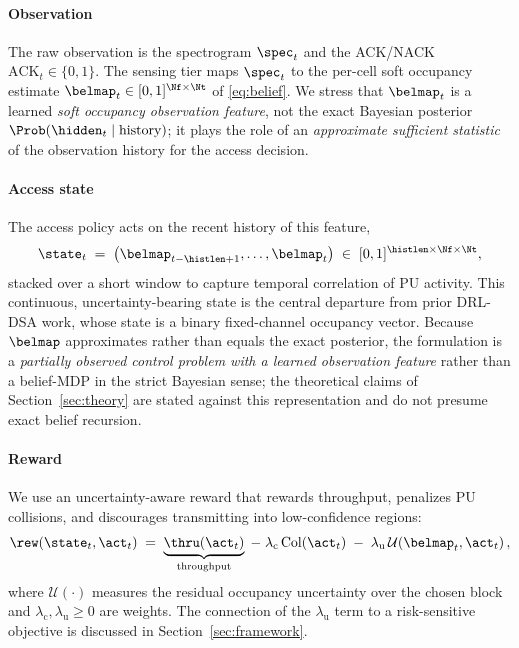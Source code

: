 \paragraph*{Observation} The raw observation is the spectrogram $\spec_t$ and
the ACK/NACK $\mathrm{ACK}_t\in\{0,1\}$. The sensing tier maps $\spec_t$ to
the per-cell soft occupancy estimate $\belmap_t\in[0,1]^{\Nf\times\Nt}$ of
\eqref{eq:belief}. We stress that $\belmap_t$ is a learned \emph{soft
occupancy observation feature}, not the exact Bayesian posterior
$\Prob(\hidden_t\mid\text{history})$; it plays the role of an
\emph{approximate sufficient statistic} of the observation history for the
access decision.

\paragraph*{Access state} The access policy acts on the recent history of
this feature,
\begin{equation}
\state_t \;=\; \bigl(\belmap_{t-\histlen+1},\dots,\belmap_{t}\bigr)
\;\in\; [0,1]^{\histlen \times \Nf \times \Nt},
\label{eq:state}
\end{equation}
stacked over a short window to capture temporal correlation of PU activity.
This continuous, uncertainty-bearing state is the central departure from
prior DRL-DSA work, whose state is a binary fixed-channel occupancy vector.
Because $\belmap$ approximates rather than equals the exact posterior, the
formulation is a \emph{partially observed control problem with a learned
observation feature} rather than a belief-MDP in the strict Bayesian sense;
the theoretical claims of Section~\ref{sec:theory} are stated against this
representation and do not presume exact belief recursion.

\paragraph*{Reward} We use an uncertainty-aware reward that rewards
throughput, penalizes PU collisions, and discourages transmitting into
low-confidence regions:
\begin{equation}
\rew(\state_t,\act_t) \;=\;
\underbrace{\thru(\act_t)}_{\text{throughput}}
\;-\; \lambda_{\mathrm{c}}\,\mathrm{Col}(\act_t)
\;-\; \lambda_{\mathrm{u}}\,\mathcal{U}\!\left(\belmap_t,\act_t\right),
\label{eq:reward}
\end{equation}
where $\mathcal{U}(\cdot)$ measures the residual occupancy uncertainty over
the chosen block and $\lambda_{\mathrm{c}},\lambda_{\mathrm{u}}\ge 0$ are
weights. The connection of the $\lambda_{\mathrm{u}}$ term to a
risk-sensitive objective is discussed in Section~\ref{sec:framework}.

